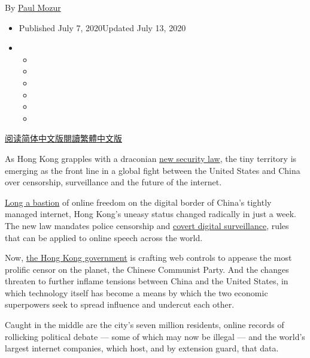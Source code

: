 By \href{https://www.nytimes3xbfgragh.onion/by/paul-mozur}{Paul Mozur}

\begin{itemize}
\item
  Published July 7, 2020Updated July 13, 2020
\item
  \begin{itemize}
  \item
  \item
  \item
  \item
  \item
  \item
  \end{itemize}
\end{itemize}

\href{https://cn.nytimes3xbfgragh.onion/business/20200708/hong-kong-security-law-tech/}{阅读简体中文版}\href{https://cn.nytimes3xbfgragh.onion/business/20200708/hong-kong-security-law-tech/zh-hant/}{閱讀繁體中文版}

As Hong Kong grapples with a draconian
\href{https://www.nytimes3xbfgragh.onion/2020/07/13/world/asia/hong-kong-elections-security.html}{new
security law}, the tiny territory is emerging as the front line in a
global fight between the United States and China over censorship,
surveillance and the future of the internet.

\href{https://www.nytimes3xbfgragh.onion/2020/07/01/world/asia/hong-kong-security-law-china.html}{Long
a bastion} of online freedom on the digital border of China's tightly
managed internet, Hong Kong's uneasy status changed radically in just a
week. The new law mandates police censorship and
\href{https://www.nytimes3xbfgragh.onion/2020/07/02/world/asia/hong-kong-security-china.html}{covert
digital surveillance}, rules that can be applied to online speech across
the world.

Now,
\href{https://www.nytimes3xbfgragh.onion/2020/07/13/world/asia/hong-kong-elections-security.html}{the
Hong Kong government} is crafting web controls to appease the most
prolific censor on the planet, the Chinese Communist Party. And the
changes threaten to further inflame tensions between China and the
United States, in which technology itself has become a means by which
the two economic superpowers seek to spread influence and undercut each
other.

Caught in the middle are the city's seven million residents, online
records of rollicking political debate --- some of which may now be
illegal --- and the world's largest internet companies, which host, and
by extension guard, that data.

